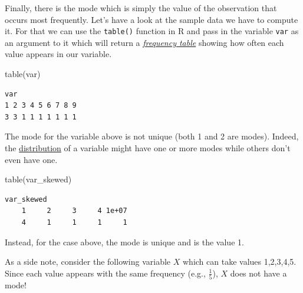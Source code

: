 \documentclass[
  letterpaper,
  DIV=11,
  numbers=noendperiod]{scrartcl}
\newenvironment{Shaded}{\begin{snugshade}}{\end{snugshade}}
\newcommand{\FunctionTok}[1]{\textcolor[rgb]{0.28,0.35,0.67}{#1}}
\newcommand{\NormalTok}[1]{\textcolor[rgb]{0.00,0.23,0.31}{#1}}
\begin{document}
Finally, there is the mode which is simply the value of the observation
that occurs most frequently. Let's have a look at the sample data we
have to compute it. For that we can use the \texttt{table()} function in
R and pass in the variable \texttt{var} as an argument to it which will
return a
\href{https://www.ncl.ac.uk/webtemplate/ask-assets/external/maths-resources/statistics/data-presentation/frequency-distribution-tables.html\#:~:text=A\%20frequency\%20table\%20is\%20a,qualitative\%20or\%20quantitative\%20discrete\%20data.}{\emph{frequency
table}} showing how often each value appears in our variable.

\begin{Shaded}
\begin{Highlighting}[]
\FunctionTok{table}\NormalTok{(var)}
\end{Highlighting}
\end{Shaded}

\begin{verbatim}
var
1 2 3 4 5 6 7 8 9 
3 3 1 1 1 1 1 1 1 
\end{verbatim}

The mode for the variable above is not unique (both 1 and 2 are modes).
Indeed, the
\href{https://aarongullickson.github.io/stat_book/the-distribution-of-a-variable.html}{distribution}
of a variable might have one or more modes while others don't even have
one.

\begin{Shaded}
\begin{Highlighting}[]
\FunctionTok{table}\NormalTok{(var\_skewed)}
\end{Highlighting}
\end{Shaded}

\begin{verbatim}
var_skewed
    1     2     3     4 1e+07 
    4     1     1     1     1 
\end{verbatim}

Instead, for the case above, the mode is unique and is the value 1.

\begin{tcolorbox}[enhanced jigsaw, bottomrule=.15mm, colframe=quarto-callout-note-color-frame, arc=.35mm, leftrule=.75mm, toptitle=1mm, toprule=.15mm, titlerule=0mm, breakable, opacityback=0, colbacktitle=quarto-callout-note-color!10!white, coltitle=black, bottomtitle=1mm, colback=white, title=\textcolor{quarto-callout-note-color}{\faInfo}\hspace{0.5em}{Note}, left=2mm, rightrule=.15mm, opacitybacktitle=0.6]

As a side note, consider the following variable \(X\) which can take
values 1,2,3,4,5. Since each value appears with the same frequency
(e.g., \(\frac{1}{5}\)), \(X\) does not have a mode!

\end{tcolorbox}
\end{document}
